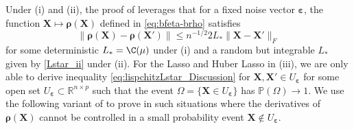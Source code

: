 \documentclass[11pt]{amsart}
\numberwithin{equation}{section}
\numberwithin{equation}{section}
\def\real{{\mathbb{R}}}
\def\R{{\real}}
\def\P{{\mathbb{P}}}
\def\mathbold{\boldsymbol} %
\def\bX{\mathbold{X}}\def\hbX{{\widehat{\bX}}}\def\tbX{{\widetilde{\bX}}}\def\bXbar{{\overline \bX}}
\def\ep{\varepsilon}\def\eps{\epsilon}\def\veps{\varepsilon}
\def\bep{ {\mathbold{\ep} }}
\def\brho{\mathbold{\rho}}\def\rhohat{\widehat{\rho}}\def\hrho{\widehat{\rho}}
\begin{document}
{Under (i) and (ii), the proof of 
leverages that for a fixed noise vector $\bep$, the function
$\bX\mapsto \brho(\bX)$ defined in \eqref{eq:bfeta-brho} satisfies
\begin{equation}
\|\brho(\bX)-\brho(\bX')\|
\le n^{-1/2} 2 L_* \|\bX - \bX'\|_F
\label{eq:lispchitzLstar_Discussion}
\end{equation}
for some deterministic $L_*=\C(\mu)$ under (i)
and a random but integrable $L_*$ given by \eqref{Lstar_ii}
under (ii).
For the Lasso and Huber Lasso in (iii),
we are only able to derive 
inequality \eqref{eq:lispchitzLstar_Discussion} for $\bX,\bX'\in U_\bep$
for some open set $U_{\bep}\subset\R^{n\times p}$ such that the
event $\Omega = \{ \bX\in U_\bep\}$ has $\P(\Omega)\to 1$.
We use the following variant of  to prove 
in such situations where the derivatives of $\brho(\bX)$ cannot be controlled
in a small probability event $\bX\not\in U_\bep$.

}
\end{document}
